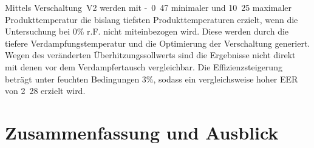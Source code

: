 Mittels Verschaltung~V2 werden mit \unit{-0.47}{\celsius} minimaler und \unit{10.25}{\celsius} maximaler Produkttemperatur die bislang tiefsten Produkttemperaturen erzielt, wenn die Untersuchung bei \unit{0}{\%} r.F. nicht miteinbezogen wird. Diese werden durch die tiefere Verdampfungstemperatur und die Optimierung der Verschaltung generiert. Wegen des veränderten Überhitzungssollwerts sind die Ergebnisse nicht direkt mit denen vor dem Verdampfertausch vergleichbar.
Die Effizienzsteigerung beträgt unter feuchten Bedingungen \unit{3}{\%}, sodass ein vergleichsweise hoher EER von \unit{2.28}{} erzielt wird. 



\chapter{Zusammenfassung und Ausblick}
\label{cha:Zusammenfassung}


